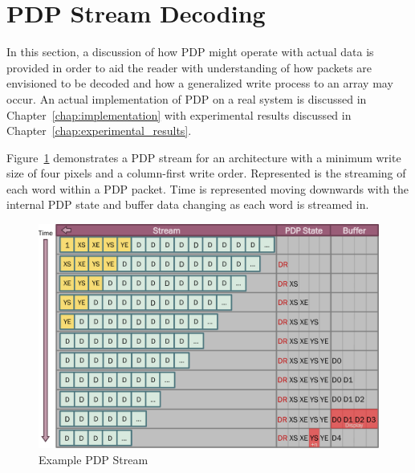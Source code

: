 \section{PDP Stream Decoding}
    \label{sec:pdp_stream_decoding}
    In this section, a discussion of how PDP might operate with actual data is provided in order to aid the reader with understanding of how packets are envisioned to be decoded and how a generalized write process to an array may occur. An actual implementation of PDP on a real system is discussed in Chapter~\ref{chap:implementation} with experimental results discussed in Chapter~\ref{chap:experimental_results}.

    Figure~\ref{fig:pdp_stream} demonstrates a PDP stream for an architecture with a minimum write size of four pixels and a column-first write order. Represented is the streaming of each word within a PDP packet. Time is represented moving downwards with the internal PDP state and buffer data changing as each word is streamed in.

    \begin{figure}
        \centering
        \includegraphics[width=1.0\textwidth]{fig/pdp_stream.pdf}
        \caption{Example PDP Stream}
        \label{fig:pdp_stream}
    \end{figure}

